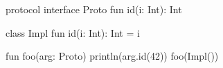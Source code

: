 \begin{pyglist}[language=kotlin]
protocol interface Proto {
    fun id(i: Int): Int
}

class Impl {
    fun id(i: Int): Int = i
}

fun foo(arg: Proto) {
    println(arg.id(42))
}
foo(Impl())
\end{pyglist}


